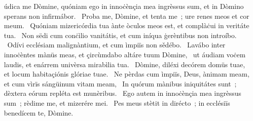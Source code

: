 \psalmChapterWithInscription{}
{ }
{%
údica me Dòmine, quóniam ego in innoċènçia mea ingrèssus sum, et in Dòmino sperans non infirmábor. 
~Proba me, Dòmine, et tenta me~; ure renes meos et cor meum. 
~Quóniam mizericórdia tua ànte òculos meos est, et complàċui in veritáte tua. 
~Non sëdi cum conċìlio vanitátis, et cum iníqua ġerèntibus non introíbo. 
~Odívi ecclésiam malignàntium, et cum ìmpiïs non sědébo. 
~Lavábo inter innoċèntes mànüs meas, et çircùmdabo altáre tuum Dòmine, 
~ut áudiam voċem laudis, et enárrem univèrsa mirabìlia tua. 
~Dòmine, diléxi decórem domüs tuae, et locum habitaçiónis glóriae tuae. 
~Ne pèrdas cum ìmpiïs, Deus, ànimam meam, et cum vìrïs sángüinum vitam meam, 
~In quórum mànibus iniquitátes sunt~; dèxtera eórum repléta est munèribus. 
~Ego autem in innoċènçia mea ingrèssus sum~; rèdime me, et mizerére mei. 
~Pes meus stètit in dirécto~; in ecclésiïs benedícem te, Dòmine. 
}
